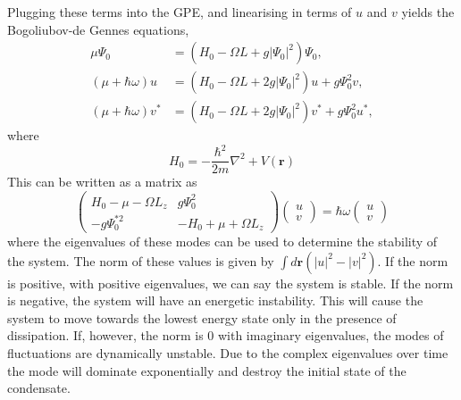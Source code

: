 Plugging these terms into the GPE, and linearising in terms of $u$ and $v$ yields the Bogoliubov-de Gennes equations,
\begin{subequations}\label{eqn:bogo_lhsrhs}
\begin{align}
    \mu \Psi_0 &= (H_0 - \Omega L + g |\Psi_0|^2)\Psi_0,\\
    (\mu +\hbar\omega)u &= (H_0 - \Omega L + 2g|\Psi_0|^2)u + g\Psi_0^2 v,\\
    (\mu +\hbar\omega)v^{*} &= (H_0 - \Omega L + 2g|\Psi_0|^2)v^{*} + g\Psi_0^2 u^{*},
\end{align}
\end{subequations}
where
\begin{equation}\label{eqn:bogo_h0}
H_0 = -\frac{\hbar^2}{2m}\nabla^2 + V(\mathbf{r})
\end{equation}
This can be written as a matrix as
\begin{equation}
    \begin{pmatrix}
        H_0 - \mu -\Omega L_z & g\Psi_0^2 \\
        -g\Psi_0^{*2} & -H_0 + \mu +\Omega L_z
    \end{pmatrix}
    \begin{pmatrix}
        u \\
        v
    \end{pmatrix}
    = \hbar\omega
    \begin{pmatrix}
        u \\
        v
    \end{pmatrix}
\end{equation}
where the eigenvalues of these modes can be used to determine the stability of the system. The norm of these values is given by $\int d\mathbf{r}(|u|^2 - |v|^2)$. If the norm is positive, with positive eigenvalues, we can say the system is stable. If the norm is negative, the system will have an energetic instability. This will cause the system to move towards the lowest energy state only in the presence of dissipation. If, however, the norm is 0 with imaginary eigenvalues, the modes of fluctuations are dynamically unstable. Due to the complex eigenvalues over time the mode will dominate exponentially and destroy the initial state of the condensate. %

\iffalse
